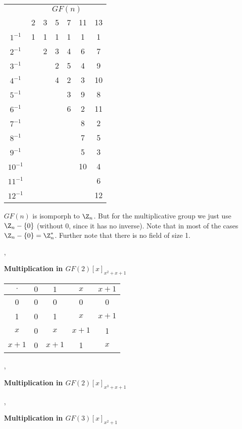\begin{tabular}{|c|c|c|c|c|c|c|}
\toprule
& \multicolumn{6}{c|}{$GF(n)$}
\\
          & 2 & 3 & 5 & 7 & 11 &  13\\
\midrule
$1^{-1}$  & 1 & 1 & 1 & 1 &  1 &   1\\
\hline
$2^{-1}$  &   & 2 & 3 & 4 &  6 &   7\\
\hline
$3^{-1}$  &   &   & 2 & 5 &  4 &   9\\
\hline
$4^{-1}$  &   &   & 4 & 2 &  3 &  10\\
\hline
$5^{-1}$  &   &   &   & 3 &  9 &   8\\
\hline
$6^{-1}$  &   &   &   & 6 &  2 &  11\\
\hline
$7^{-1}$  &   &   &   &   &  8 &   2\\
\hline
$8^{-1}$  &   &   &   &   &  7 &   5\\
\hline 
$9^{-1}$  &   &   &   &   &  5 &   3\\
\hline
$10^{-1}$  &   &   &   &   & 10 &  4\\
\hline
$11^{-1}$  &   &   &   &   &    &  6\\
\hline
$12^{-1}$  &   &   &   &   &    & 12\\
\bottomrule
\end{tabular}

\Com $GF(n)$ is isomporph to $\Z_n$. But for the multiplicative group we just
use $\Z_n-\{0\}$ (without $0$, since it has no inverse). Note that in most of
the cases $\Z_n-\{0\}=\Z^*_n$. Further note that there is no field of size
1.


\sep

\textbf{Multiplication in $GF(2)[x]_{x^2+x+1}$}

\begin{tabular}{c|cccc}
$\cdot$ & $0$ & $1$ & $x$ & $x+1$\\
\hline
0 & 0 & 0 & 0 & 0\\
1 & 0 & 1 & $x$ & $x+1$\\
$x$ & 0 & $x$ & $x+1$ & 1\\
$x+1$ & 0 & $x+1$ & 1 & $x$
\end{tabular}

\sep

\textbf{Multiplication in $GF(2)[x]_{x^3+x+1}$}


\sep

\textbf{Multiplication in $GF(3)[x]_{x^2+1}$}

